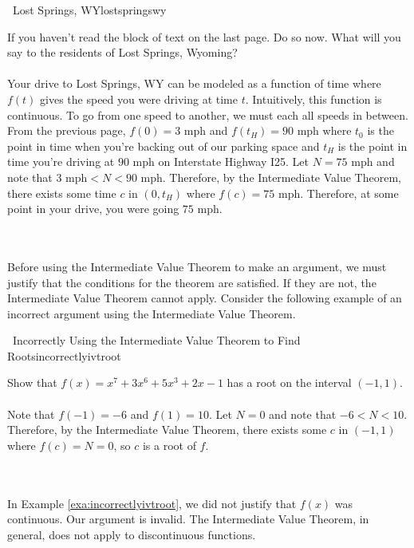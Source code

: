         \begin{example}{\Difficulty\,\Difficulty\,\,Lost Springs, WY}{lostspringswy}

            If you haven't read the block of text on the last page. Do so now. What will you say to the residents of Lost Springs, Wyoming?
            \\
            \\
            Your drive to Lost Springs, WY can be modeled as a function of time where \(f(t)\) gives the speed you were driving at time \(t\). Intuitively, this function is continuous. To go from one speed to another, we must each all speeds in between. From the previous page, \(f(0)=3\text{ mph}\) and \(f(t_H)=90\text{ mph}\) where \(t_0\) is the point in time when you're backing out of our parking space and \(t_H\) is the point in time you're driving at \(90\text{ mph}\) on Interstate Highway I25. Let \(N=75\text{ mph}\) and note that \(3\text{ mph}<N<90\text{ mph}\). Therefore, by the Intermediate Value Theorem, there exists some time \(c\) in \((0,t_H)\) where \(f(c)=75\text{ mph}\). Therefore, at some point in your drive, you were going \(75\text{ mph}\).

        \end{example}
        \pagebreak
        \vphantom
        \\
        \\
        Before using the Intermediate Value Theorem to make an argument, we must justify that the conditions for the theorem are satisfied. If they are not, the Intermediate Value Theorem cannot apply. Consider the following example of an incorrect argument using the Intermediate Value Theorem.
        \begin{example}{\Difficulty\,\Difficulty\,\,Incorrectly Using the Intermediate Value Theorem to Find Roots}{incorrectlyivtroot}

            Show that \(f(x)=x^7+3x^6+5x^3+2x-1\) has a root on the interval \((-1,1)\). 
            \\
            \\
            Note that \(f(-1)=-6\) and \(f(1)=10\). Let \(N=0\) and note that \(-6<N<10\). Therefore, by the Intermediate Value Theorem, there exists some \(c\) in \((-1,1)\) where \(f(c)=N=0\), so \(c\) is a root of \(f\).

        \end{example}
        \vphantom
        \\
        \\
        In Example \ref{exa:incorrectlyivtroot}, we did not justify that \(f(x)\) was continuous. Our argument is invalid. The Intermediate Value Theorem, in general, does not apply to discontinuous functions.

